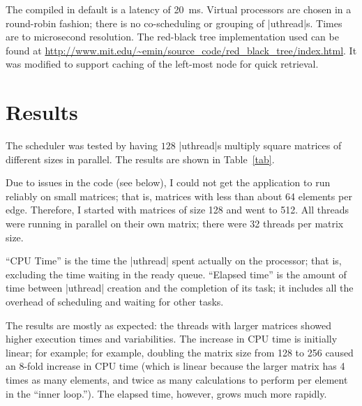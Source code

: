 \documentclass[]{article}
\begin{document}
The compiled in default is a latency of \SI{20}{\milli\second}.
Virtual processors are chosen in a round-robin fashion; there is no
co-scheduling or grouping of |uthread|s. Times are to microsecond
resolution. The red-black tree implementation used can be found at
\url{http://www.mit.edu/~emin/source_code/red_black_tree/index.html}.
It was modified to support caching of the left-most node for quick
retrieval.


\section{Results} 
\label{sec:results}

The scheduler was tested by having $128$ |uthread|s multiply square
matrices of different sizes in parallel. The results are shown in
Table~\ref{tab}.

Due to issues in the code (see below), I could not get the application
to run reliably on small matrices; that is, matrices with less than
about 64 elements per edge. Therefore, I started with matrices of size
128 and went to 512. All threads were running in parallel on their own
matrix; there were 32 threads per matrix size.

``CPU Time'' is the time the |uthread| spent actually on the
processor; that is, excluding the time waiting in the ready queue.
``Elapsed time'' is the amount of time between |uthread| creation and
the completion of its task; it includes all the overhead of scheduling
and waiting for other tasks.

The results are mostly as expected: the threads with larger matrices
showed higher execution times and variabilities. The increase in CPU
time is initially linear; for example; for example, doubling the
matrix size from 128 to 256 caused an 8-fold increase in CPU time
(which is linear because the larger matrix has 4 times as many
elements, and twice as many calculations to perform per element in the
``inner loop.''). The elapsed time, however, grows much more rapidly.
\end{document}
